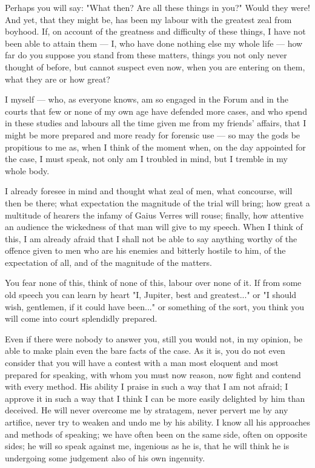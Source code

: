  Perhaps you will say: "What then? Are all these things in you?" Would they were! And yet, that they might be, has been my labour with the greatest zeal from boyhood. If, on account of the greatness and difficulty of these things, I have not been able to attain them --- I, who have done nothing else my whole life --- how far do you suppose you stand from these matters, things you not only never thought of before, but cannot suspect even now, when you are entering on them, what they are or how great?

 I myself --- who, as everyone knows, am so engaged in the Forum and in the courts that few or none of my own age have defended more cases, and who spend in these studies and labours all the time given me from my friends' affairs, that I might be more prepared and more ready for forensic use --- so may the gods be propitious to me as, when I think of the moment when, on the day appointed for the case, I must speak, not only am I troubled in mind, but I tremble in my whole body.

 I already foresee in mind and thought what zeal of men, what concourse, will then be there; what expectation the magnitude of the trial will bring; how great a multitude of hearers the infamy of Gaius Verres will rouse; finally, how attentive an audience the wickedness of that man will give to my speech. When I think of this, I am already afraid that I shall not be able to say anything worthy of the offence given to men who are his enemies and bitterly hostile to him, of the expectation of all, and of the magnitude of the matters.

 You fear none of this, think of none of this, labour over none of it. If from some old speech you can learn by heart "I, Jupiter, best and greatest..." or "I should wish, gentlemen, if it could have been..." or something of the sort, you think you will come into court splendidly prepared.

 Even if there were nobody to answer you, still you would not, in my opinion, be able to make plain even the bare facts of the case. As it is, you do not even consider that you will have a contest with a man most eloquent and most prepared for speaking, with whom you must now reason, now fight and contend with every method. His ability I praise in such a way that I am not afraid; I approve it in such a way that I think I can be more easily delighted by him than deceived. He will never overcome me by stratagem, never pervert me by any artifice, never try to weaken and undo me by his ability. I know all his approaches and methods of speaking; we have often been on the same side, often on opposite sides; he will so speak against me, ingenious as he is, that he will think he is undergoing some judgement also of his own ingenuity.

